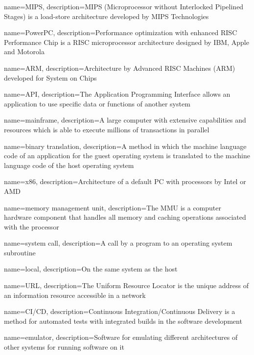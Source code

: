 {
    name={MIPS},
    description={MIPS (Microprocessor without Interlocked Pipelined Stages) is a load-store architecture developed by MIPS Technologies}
}

{
    name={PowerPC},
    description={Performance optimization with enhanced RISC Performance Chip is a RISC microprocessor architecture designed by IBM, Apple and Motorola}
}

{
    name={ARM},
    description={Architecture by Advanced RISC Machines (ARM) developed for System on Chips}
}

{
    name={API},
    description={The Application Programming Interface allows an application to use specific data or functions of another system}
}

{
    name={mainframe},
    description={A large computer with extensive capabilities and resources which is able to execute millions of transactions in parallel}
}

{
    name={binary translation},
    description={A method in which the machine language code of an application for the guest operating system is translated to the machine language code of the host operating system}
}

{
    name={x86},
    description={Architecture of a default PC with processors by Intel or AMD}
}

{
    name={memory management unit},
    description={The MMU is a computer hardware component that handles all memory and caching operations associated with the processor}
}

{
    name={system call},
    description={A call by a program to an operating system subroutine}
}

{
    name={local},
    description={On the same system as the host}
}

{
    name={URL},
    description={The Uniform Resource Locator is the unique address of an information resource accessible in a network}
}

{
    name={CI/CD},
    description={Continuous Integration/Continuous Delivery is a method for automated tests with integrated builds in the software development}
}

{
    name={emulator},
    description={Software for emulating different architectures of other systems for running software on it}
}


